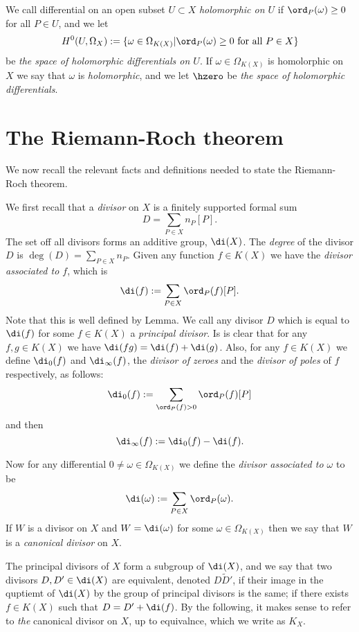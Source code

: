 We call differential on an open subset $U \subset X$ \emph{holomorphic on $U$} if $\ord_P(\omega) \geq 0$ for all $P \in U$, and we let
    \[
    H^0(U, \Omega_X) := \{ \omega \in \Omega_{K(X)} | \ord_P(\omega) \geq 0\ \text{for all}\ P \in X\}
    \]
be \emph{the space of holomorphic differentials on $U$}.
If $\omega \in \Omega_{K(X)}$ is homolorphic on $X$ we say that $\omega$ is \emph{holomorphic}, and we let $\hzero$ be \emph{the space of holomorphic differentials}.

\section{The Riemann-Roch theorem}

We now recall the relevant facts and definitions needed to state the Riemann-Roch theorem.

We first recall that a \emph{divisor} on $X$ is a finitely supported formal sum 
    \[
    D = \sum_{P \in X} n_P[P].
    \]
The set off all divisors forms an additive group, $\di (X)$.
The \emph{degree} of the divisor $D$ is $\deg(D) = \sum_{P \in X} n_P$.
Given any function $f \in K(X)$ we have the \emph{divisor associated to $f$}, which is
    \[
    \di(f) := \sum_{P \in X} \ord_P(f) [P].
    \]
Note that this is well defined by Lemma. 
We call any divisor $D$ which is equal to $\di(f)$ for some $f \in K(X)$ a \emph{principal divisor}.
Is is clear that for any $f, g \in K(X)$ we have $\di(fg) = \di(f) + \di(g)$.
Also, for any $f \in K(X)$ we define $\di_0(f)$ and $\di_\infty (f)$, the \emph{divisor of zeroes} and the \emph{divisor of poles} of $f$ respectively, as follows:
    \[
    \di_0(f) := \sum_{\ord_P(f) >0} \ord_P(f)[P]
    \]
and then
    \[
    \di_\infty(f) := \di_0(f) - \di(f).
    \]

Now for any differential $0 \neq \omega \in \Omega_{K(X)}$ we define the \emph{divisor associated to $\omega$} to be
    \[
    \di(\omega) := \sum_{P \in X} \ord_P(\omega).
    \]
If $W$ is a divisor on $X$ and $W = \di(\omega)$ for some $ \omega \in \Omega_{K(X)}$ then we say that $W$ is a \emph{canonical divisor} on $X$.

The principal divisors of $X$ form a subgroup of $\di(X)$, and we say that two divisors $D, D' \in \di(X)$ are equivalent, denoted $D \tilde D'$, if their image in the quptiemt of $\di(X)$ by the group of principal divisors is the same; \ie if there exists $f \in K(X)$ such that $ D = D' + \di(f)$.
By the following, it makes sense to refer to \emph{the} canonical divisor on $X$, up to equivalnce, which we write as $K_X$.


